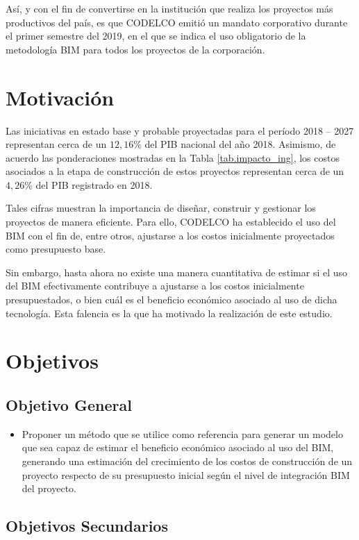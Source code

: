 Así, y con el fin de convertirse en la institución que realiza los proyectos más productivos del país, es que CODELCO emitió un mandato corporativo durante el primer semestre del 2019, en el que se indica el uso obligatorio de la metodología BIM para todos los proyectos de la corporación.

\section{Motivación}

Las iniciativas en estado base y probable proyectadas para el período 2018 -- 2027 representan cerca de un $12,16$\% del PIB nacional del año 2018. Asimismo, de acuerdo las ponderaciones mostradas en la Tabla \ref{tab.impacto_ing}, los costos asociados a la etapa de construcción de estos proyectos representan cerca de un $4,26$\% del PIB registrado en 2018.

Tales cifras muestran la importancia de diseñar, construir y gestionar los proyectos de manera eficiente. Para ello, CODELCO ha establecido el uso del BIM con el fin de, entre otros, ajustarse a los costos inicialmente proyectados como presupuesto base.

Sin embargo, hasta ahora no existe una manera cuantitativa de estimar si el uso del BIM efectivamente contribuye a ajustarse a los costos inicialmente presupuestados, o bien cuál es el beneficio económico asociado al uso de dicha tecnología. Esta falencia es la que ha motivado la realización de este estudio.

\section{Objetivos}

\subsection{Objetivo General}

\begin{itemize}
    \item Proponer un método que se utilice como referencia para generar un modelo que sea capaz de estimar el beneficio económico asociado al uso del BIM, generando una estimación del crecimiento de los costos de construcción de un proyecto respecto de su presupuesto inicial según el nivel de integración BIM del proyecto.
\end{itemize}

\subsection{Objetivos Secundarios}

